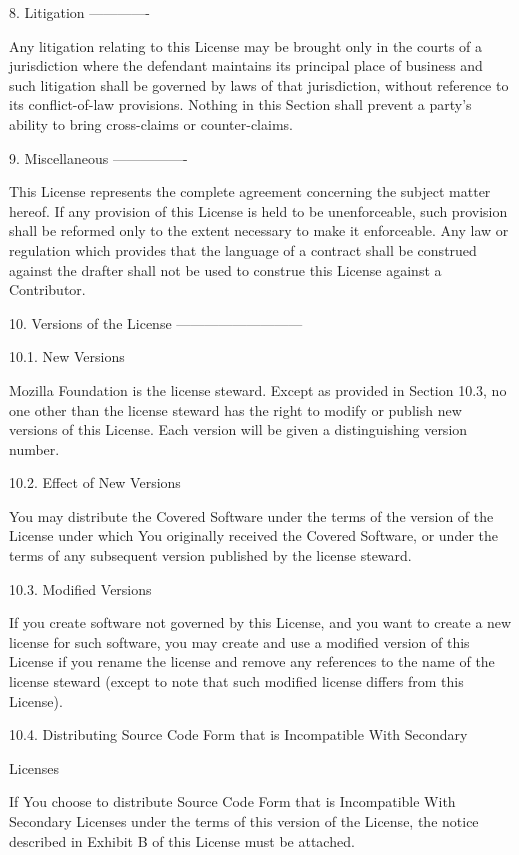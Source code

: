 \begin{DoxyVerb}
8. Litigation
-------------

Any litigation relating to this License may be brought only in the
courts of a jurisdiction where the defendant maintains its principal
place of business and such litigation shall be governed by laws of that
jurisdiction, without reference to its conflict-of-law provisions.
Nothing in this Section shall prevent a party's ability to bring
cross-claims or counter-claims.

9. Miscellaneous
----------------

This License represents the complete agreement concerning the subject
matter hereof. If any provision of this License is held to be
unenforceable, such provision shall be reformed only to the extent
necessary to make it enforceable. Any law or regulation which provides
that the language of a contract shall be construed against the drafter
shall not be used to construe this License against a Contributor.

10. Versions of the License
---------------------------

10.1. New Versions

Mozilla Foundation is the license steward. Except as provided in Section
10.3, no one other than the license steward has the right to modify or
publish new versions of this License. Each version will be given a
distinguishing version number.

10.2. Effect of New Versions

You may distribute the Covered Software under the terms of the version
of the License under which You originally received the Covered Software,
or under the terms of any subsequent version published by the license steward.

10.3. Modified Versions

If you create software not governed by this License, and you want to
create a new license for such software, you may create and use a
modified version of this License if you rename the license and remove
any references to the name of the license steward (except to note that
such modified license differs from this License).

10.4. Distributing Source Code Form that is Incompatible With Secondary

Licenses

If You choose to distribute Source Code Form that is Incompatible With
Secondary Licenses under the terms of this version of the License, the
notice described in Exhibit B of this License must be attached.


\end{DoxyVerb}

